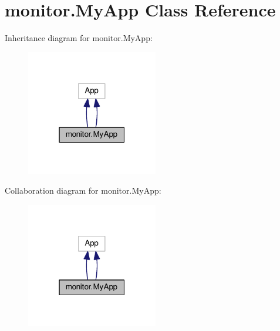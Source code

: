 \hypertarget{classmonitor_1_1MyApp}{}\section{monitor.\+My\+App Class Reference}
\label{classmonitor_1_1MyApp}


Inheritance diagram for monitor.\+My\+App\+:
\nopagebreak
\begin{figure}[H]
\begin{center}
\leavevmode
\includegraphics[width=163pt]{d7/df8/classmonitor_1_1MyApp__inherit__graph}
\end{center}
\end{figure}


Collaboration diagram for monitor.\+My\+App\+:
\nopagebreak
\begin{figure}[H]
\begin{center}
\leavevmode
\includegraphics[width=163pt]{d5/d39/classmonitor_1_1MyApp__coll__graph}
\end{center}
\end{figure}
